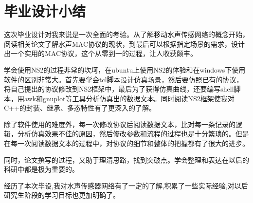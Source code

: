 \chapter*{毕业设计小结}
这次毕业设计对我来说是一次全面的考验。从了解移动水声传感网络的概念开始，阅读相关论文了解水声MAC协议的现状，到最后可以根据指定场景的需求，设计出一个实用的MAC协议，这个从零到一的过程，让人收获颇丰。

学会使用NS2的过程非常的坎坷，在ubuntu上使用NS2的体验和在windows下使用软件的区别非常大。首先要学会tcl脚本设计仿真场景，然后要仿照已有的协议，将自己提出的协议修改到NS2框架中，最后为了获得仿真曲线，还要编写shell脚本，用awk和gnuplot等工具分析仿真出的数据文本。同时阅读NS2框架使我对C++的封装、继承、多态特性有了更深入的了解。

除了软件使用的难度外，每一次修改协议后阅读数据文本，比对每一条记录的逻辑，分析仿真效果不佳的原因，然后修改参数和流程的过程也是十分繁琐的。但是在每一次阅读数据文本的过程中，对协议的细节和整体的把握都有了很大的进步。

同时，论文撰写的过程，又助于理清思路，找到突破点。学会整理和表达在以后的科研中都是极为重要的。

经历了本次毕设,我对水声传感器网络有了一定的了解,积累了一些实际经验,对以后研究生阶段的学习目标也更加明确了。


\clearpage
\endinput